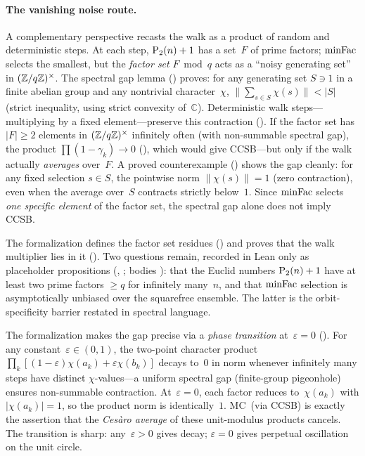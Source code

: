 \paragraph{The vanishing noise route.}
A complementary perspective recasts the walk as a product of random
and deterministic steps.  At each step, $\mathrm{P}_{2}(n)+1$ has a set~$F$
of prime factors; $\mathrm{minFac}$ selects the smallest, but the
\emph{factor set} $F \bmod q$ acts as a ``noisy generating set'' in
$(\mathbb{Z}/q\mathbb{Z})^\times$.  The spectral gap lemma
()
proves: for any generating set $S \ni 1$ in a finite abelian group
and any nontrivial character~$\chi$,
$\|\sum_{s \in S} \chi(s)\| < |S|$
(strict inequality, using strict convexity of~$\mathbb{C}$).
Deterministic walk steps---multiplying by a fixed element---preserve
this contraction
().
If the factor set has $|F| \geq 2$ elements in $(\mathbb{Z}/q\mathbb{Z})^\times$
infinitely often (with non-summable spectral gap), the product
$\prod(1 - \gamma_k) \to 0$
(),
which would give CCSB---but only if the walk actually \emph{averages}
over~$F$.  A proved counterexample
()
shows the gap cleanly: for any fixed selection $s \in S$, the
pointwise norm $\|\chi(s)\| = 1$ (zero contraction), even when the
average over~$S$ contracts strictly below~$1$.
Since $\mathrm{minFac}$ selects \emph{one specific element} of the factor set,
the spectral gap alone does not imply CCSB\@.

The formalization defines the factor set residues
()
and proves that the walk multiplier lies in it
().
Two questions remain, recorded in Lean only as placeholder
propositions (,
; bodies ):
that the Euclid numbers $\mathrm{P}_{2}(n)+1$ have at least two prime factors
$\geq q$ for infinitely many~$n$, and that $\mathrm{minFac}$ selection is
asymptotically unbiased over the squarefree ensemble.
The latter is the orbit-specificity barrier
restated in spectral language.

The formalization makes the gap precise via a \emph{phase transition}
at~$\varepsilon = 0$
().
For any constant~$\varepsilon \in (0,1)$, the two-point character
product $\prod_k[(1{-}\varepsilon)\chi(a_k) + \varepsilon\chi(b_k)]$
decays to~$0$ in norm whenever infinitely many steps have distinct
$\chi$-values---a uniform spectral gap (finite-group pigeonhole)
ensures non-summable contraction.  At~$\varepsilon = 0$, each factor
reduces to~$\chi(a_k)$ with $|\chi(a_k)| = 1$, so the product norm is
identically~$1$.  MC~(via CCSB) is exactly the assertion that the
\emph{Cesàro average} of these unit-modulus products cancels.
The transition is sharp: any~$\varepsilon > 0$ gives decay; $\varepsilon = 0$
gives perpetual oscillation on the unit circle.

